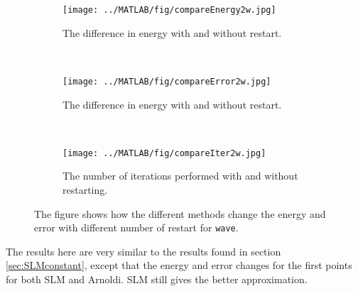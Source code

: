 \begin{figure}[H]
        \centering
        \begin{subfigure}[b]{0.3\textwidth}
                \texttt{[image: ../MATLAB/fig/compareEnergy2w.jpg]}
                \caption{ The difference in energy with and without restart. }
                \label{fig:compareEnergy2w}
        \end{subfigure}
        ~
        \begin{subfigure}[b]{0.3\textwidth}
                \texttt{[image: ../MATLAB/fig/compareError2w.jpg]}
                \caption{ The difference in energy with and without restart. }
                \label{fig:compareError2w}
        \end{subfigure}
        ~
        \begin{subfigure}[b]{0.3\textwidth}
                \texttt{[image: ../MATLAB/fig/compareIter2w.jpg]}
                \caption{ The number of iterations performed with and without restarting.  }
                \label{fig:compareIter2w}
        \end{subfigure}
        \caption{ The figure shows how the different methods change the energy and error with different number of restart for \texttt{wave}.  }
        \label{fig:compare2w}
\end{figure}
The results here are very similar to the results found in section \ref{sec:SLMconstant}, except that the energy and error changes for the first points for both SLM and Arnoldi. SLM still gives the better approximation.